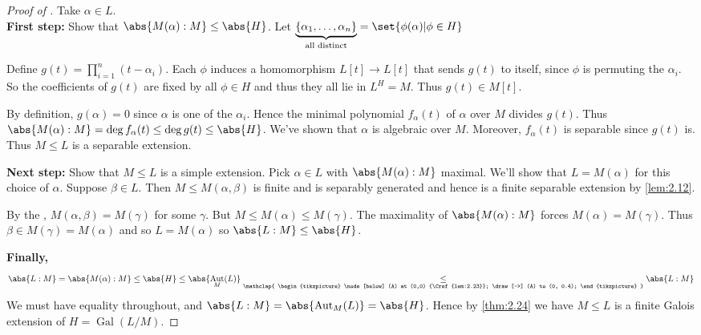 \documentclass{article}
\DeclareMathOperator{\Aut}{Aut}
\DeclareMathOperator{\Gal}{Gal}
\begin{document}
\begin{proof}[Proof of ]
    Take $\alpha \in L$. \\
    \textbf{First step:} Show that $\abs{M(\alpha):M} \leq \abs{H}$.
    Let $\underbrace{\{\alpha_1, \dotsc, \alpha_n\}}_{\text{all distinct}} = \set{\phi(\alpha) | \phi \in H}$

    Define $g(t) = \prod_{i=1}^n (t-\alpha_i)$.
    Each $\phi$ induces a homomorphism $L[t] \to L[t]$ that sends $g(t)$ to itself, since $\phi$ is permuting the $\alpha_i$.
    So the coefficients of $g(t)$ are fixed by all $\phi \in H$ and thus they all lie in $L^H = M$.
    Thus $g(t) \in M[t]$.

    By definition, $g(\alpha) = 0$ since $\alpha$ is one of the $\alpha_i$.
    Hence the minimal polynomial $f_\alpha(t)$ of $\alpha$ over $M$ divides $g(t)$.
    Thus $\abs{M(\alpha):M} = \deg f_\alpha(t) \leq \deg g(t) \leq \abs{H}$.
    We've shown that $\alpha$ is algebraic over $M$.
    Moreover, $f_\alpha(t)$ is separable since $g(t)$ is.
    Thus $M \leq L$ is a separable extension.

    \textbf{Next step:} Show that $M \leq L$ is a simple extension.
    Pick $\alpha \in L$ with $\abs{M(\alpha):M}$ maximal.
    We'll show that $L = M(\alpha)$ for this choice of $\alpha$.
    Suppose $\beta \in L$. Then $M \leq M(\alpha, \beta)$ is finite and is separably generated and hence is a finite separable extension by \cref{lem:2.12}.

    By the , $M(\alpha, \beta) = M(\gamma)$ for some $\gamma$.
    But $M \leq M(\alpha) \leq M(\gamma)$.
    The maximality of $\abs{M(\alpha):M}$ forces $M(\alpha) = M(\gamma)$.
    Thus $\beta \in M(\gamma) = M(\alpha)$ and so $L = M(\alpha)$ so $\abs{L:M} \leq \abs{H}$.

    \textbf{Finally,}
    \begin{equation*}
        \abs{L:M} = \abs{M(\alpha):M} \leq \abs{H} \leq \abs{\Aut_M(L)} \underset{\mathclap{
        \begin{tikzpicture}
            \node[below] (A) at (0,0) {\Cref{lem:2.23}};
            \draw[->] (A) to (0, 0.4);
        \end{tikzpicture}
        }}{\leq} \abs{L:M}
    \end{equation*}
    We must have equality throughout, and $\abs{L:M} = \abs{\Aut_M(L)} = \abs{H}$.
    Hence by \cref{thm:2.24} we have $M \leq L$ is a finite Galois extension of $H = \Gal(L/M)$.  %
\end{proof}
\end{document}
